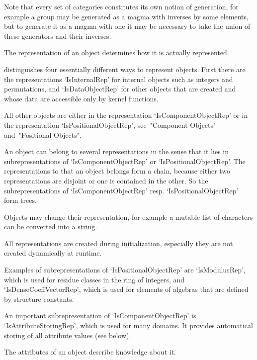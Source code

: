 Note that every set of categories constitutes its own notion of
generation, for example a group may be generated as a magma with inverses
by some elements,
but to generate it as a magma with one it may be necessary to take the
union of these generators and their inverses.


The representation of an object determines how it is actually
represented.

{\GAP} distinguishes four essentially different ways to represent
objects.
First there are the representations `IsInternalRep' for internal objects
such as integers and permutations,
and `IsDataObjectRep' for other objects that are created and whose data
are accessible only by kernel functions.


All other objects are either in the representation `IsComponentObjectRep'
or in the representation `IsPositionalObjectRep',
see~"Component Objects" and~"Positional Objects".

An object can belong to several representations in the sense that it lies
in subrepresentations of `IsComponentObjectRep' or
`IsPositionalObjectRep'.
The representations to that an object belongs form a chain, 
because either two representations are disjoint or one is contained in
the other.
So the subrepresentations of `IsComponentObjectRep' resp.
`IsPositionalObjectRep' form trees.

Objects may change their representation,
for example a mutable list of characters can be converted into a string.

All representations are created during initialization,
especially they are not created dynamically at runtime.

Examples of subrepresentations of `IsPositionalObjectRep' are
`IsModulusRep',
which is used for residue classes in the ring of integers,
and `IsDenseCoeffVectorRep',
which is used for elements of algebras that are defined by structure
constants.

An important subrepresentation of `IsComponentObjectRep' is
`IsAttributeStoringRep', which is used for many domains.
It provides automatical storing of all attribute values (see below).


The attributes of an object describe knowledge about it.

